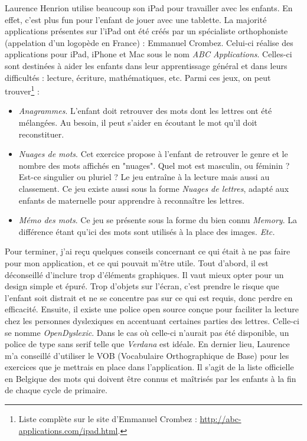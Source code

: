Laurence Henrion utilise beaucoup son iPad pour travailler avec les enfants. En effet, c'est plus fun pour l'enfant de jouer avec une tablette.
La majorité applications présentes sur l'iPad ont été créés par un spécialiste orthophoniste (appelation d'un logopède en France) : Emmanuel Crombez. Celui-ci réalise des applications pour iPad, iPhone et Mac sous le nom \textit{ABC Applications}. Celles-ci sont destinées à aider les enfants dans leur apprentissage général et dans leurs difficultés : lecture, écriture, mathématiques, etc. Parmi ces jeux, on peut trouver\footnote{Liste complète sur le site d'Emmanuel Crombez : \url{http://abc-applications.com/ipad.html}.} :
\begin{itemize}
\item \textit{Anagrammes}. L'enfant doit retrouver des mots dont les lettres ont été mélangées. Au besoin, il peut s'aider en écoutant le mot qu'il doit reconstituer.
\item \textit{Nuages de mots}. Cet exercice propose à l'enfant de retrouver le genre et le nombre des mots affichés en "nuages". Quel mot est masculin, ou féminin ? Est-ce singulier ou pluriel ? Le jeu entraîne à la lecture mais aussi au classement. Ce jeu existe aussi sous la forme \textit{Nuages de lettres}, adapté aux enfants de maternelle pour apprendre à reconnaître les lettres.
\item \textit{Mémo des mots}. Ce jeu se présente sous la forme du bien connu \textit{Memory}. La différence étant qu'ici des mots sont utilisés à la place des images.
\textit{Etc.}\\
\end{itemize}

Pour terminer, j'ai reçu quelques conseils concernant ce qui était à ne pas faire pour mon application, et ce qui pouvait m'être utile. Tout d'abord, il est déconseillé d'inclure trop d'éléments graphiques. Il vaut mieux opter pour un design simple et épuré. Trop d'objets sur l'écran, c'est prendre le risque que l'enfant soit distrait et ne se concentre pas sur ce qui est requis, donc perdre en efficacité. Ensuite, il existe une police open source conçue pour faciliter la lecture chez les personnes dyslexiques en accentuant certaines parties des lettres. Celle-ci se nomme \textit{OpenDyslexic}. Dans le cas où celle-ci n'aurait pas été disponible, un police de type sans serif telle que \textit{Verdana} est idéale. En dernier lieu, Laurence m'a conseillé d'utiliser le VOB (Vocabulaire Orthographique de Base) pour les exercices que je mettrais en place dans l'application. Il s'agit de la liste officielle en Belgique des mots qui doivent être connus et maîtrisés par les enfants à la fin de chaque cycle de primaire.


